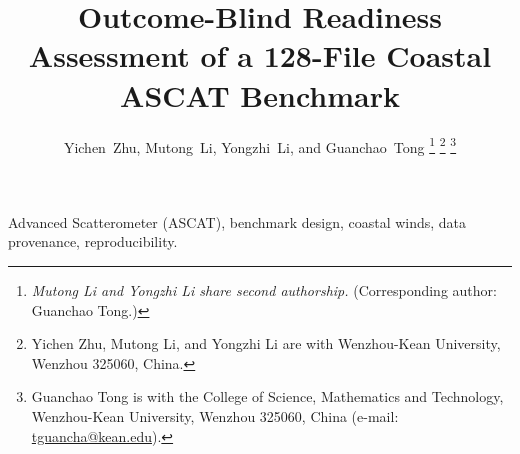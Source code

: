 \documentclass[journal,10pt]{IEEEtran}
\begin{document}
\title{Outcome-Blind Readiness Assessment of a 128-File Coastal ASCAT Benchmark}
\author{Yichen~Zhu, Mutong~Li, Yongzhi~Li, and Guanchao~Tong%
\thanks{\textit{Mutong Li and Yongzhi Li share second authorship.} (Corresponding author: Guanchao Tong.)}%
\thanks{Yichen Zhu, Mutong Li, and Yongzhi Li are with Wenzhou-Kean University, Wenzhou 325060, China.}%
\thanks{Guanchao Tong is with the College of Science, Mathematics and Technology, Wenzhou-Kean University, Wenzhou 325060, China (e-mail: \mbox{\href{mailto:tguancha@kean.edu}{tguancha@kean.edu}}).}}
\maketitle

\begin{IEEEkeywords}
Advanced Scatterometer (ASCAT), benchmark design, coastal winds, data provenance, reproducibility.
\end{IEEEkeywords}









\balance

\end{document}
